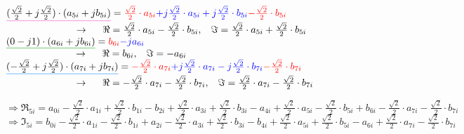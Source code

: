 $\mathunderline{pink}{(\frac{\sqrt{2}}{2}+j\frac{\sqrt{2}}{2}) \cdot (a_{5i}+jb_{5i})} = \textcolor{red}{\frac{\sqrt{2}}{2} \cdot a_{5i}} \textcolor{blue}{+j\frac{\sqrt{2}}{2} \cdot a_{5i} + j\frac{\sqrt{2}}{2} \cdot b_{5i}} \textcolor{red}{-\frac{\sqrt{2}}{2} \cdot b_{5i}}$\\

$\hspace{2.5cm}\rightarrow \hspace{0.5cm} \Re=\frac{\sqrt{2}}{2} \cdot a_{5i} -\frac{\sqrt{2}}{2} \cdot b_{5i}, \hspace{0.3cm} \Im=\frac{\sqrt{2}}{2} \cdot a_{5i} + \frac{\sqrt{2}}{2} \cdot b_{5i}$\\

$\mathunderline{mygreen}{(0-j1) \cdot (a_{6i}+jb_{6i})} = \textcolor{red}{b_{6i}} \textcolor{blue}{-ja_{6i}}$\\

$\hspace{2.5cm}\rightarrow \hspace{0.5cm} \Re=b_{6i}, \hspace{0.3cm}\Im=-a_{6i}$\\

$\mathunderline{azure}{(-\frac{\sqrt{2}}{2}+j\frac{\sqrt{2}}{2}) \cdot (a_{7i}+jb_{7i})} = \textcolor{red}{-\frac{\sqrt{2}}{2} \cdot a_{7i}} \textcolor{blue}{+j\frac{\sqrt{2}}{2} \cdot a_{7i} -j\frac{\sqrt{2}}{2} \cdot b_{7i}} \textcolor{red}{-\frac{\sqrt{2}}{2} \cdot b_{7i}}$\\

$\hspace{2.5cm}\rightarrow \hspace{0.5cm} \Re=-\frac{\sqrt{2}}{2} \cdot a_{7i} -\frac{\sqrt{2}}{2} \cdot b_{7i}, \hspace{0.3cm} \Im=\frac{\sqrt{2}}{2} \cdot a_{7i} - \frac{\sqrt{2}}{2} \cdot b_{7i}$\\

\vspace{0.5cm}

\indent$\Rightarrow \Re_{5i} = a_{0i} -\frac{\sqrt{2}}{2} \cdot a_{1i} +\frac{\sqrt{2}}{2} \cdot b_{1i} -b_{2i} +\frac{\sqrt{2}}{2} \cdot a_{3i} +\frac{\sqrt{2}}{2} \cdot b_{3i} -a_{4i} +\frac{\sqrt{2}}{2} \cdot a_{5i} -\frac{\sqrt{2}}{2} \cdot b_{5i} +b_{6i} -\frac{\sqrt{2}}{2} \cdot a_{7i} -\frac{\sqrt{2}}{2} \cdot b_{7i}$\\

\indent$\Rightarrow \Im_{5i} = b_{0i} -\frac{\sqrt{2}}{2} \cdot a_{1i} - \frac{\sqrt{2}}{2} \cdot b_{1i} +a_{2i} -\frac{\sqrt{2}}{2} \cdot a_{3i} + \frac{\sqrt{2}}{2} \cdot b_{3i} -b_{4i} +\frac{\sqrt{2}}{2} \cdot a_{5i} + \frac{\sqrt{2}}{2} \cdot b_{5i} -a_{6i} +\frac{\sqrt{2}}{2} \cdot a_{7i} - \frac{\sqrt{2}}{2} \cdot b_{7i}$\\

